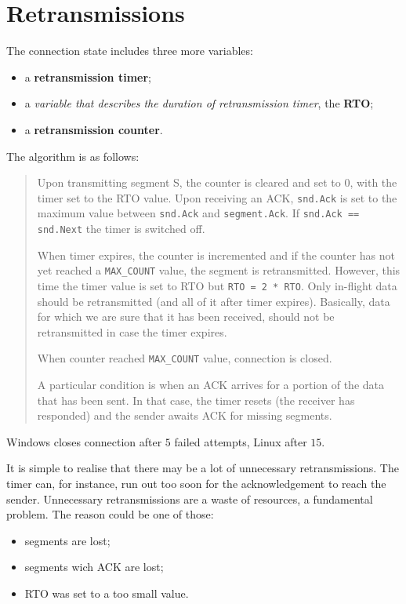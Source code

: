 \documentclass[a4paper, 11pt]{report}
\begin{document}
\section{Retransmissions}

The connection state includes three more variables:

\begin{itemize}
	\item a \textbf{retransmission timer};
	\item a \emph{variable that describes the duration of retransmission
		timer}, the \textbf{RTO};
	\item a \textbf{retransmission counter}.
\end{itemize}

The algorithm is as follows:

\begin{quote}
Upon transmitting segment S, the counter is cleared and set to $0$, with the
timer set to the RTO value. Upon receiving an ACK, \texttt{snd.Ack} is set to
the maximum value between \texttt{snd.Ack} and \texttt{segment.Ack}. If
\texttt{snd.Ack == snd.Next} the timer is switched off.

When timer expires, the counter is incremented and if the counter has not yet
reached a \texttt{MAX\_COUNT} value, the segment is retransmitted. However, this
time the timer value is set to RTO but \texttt{RTO = 2 * RTO}. Only in-flight data
should be retransmitted (and all of it after timer expires). Basically, data
for which we are sure that it has been received, should not be retransmitted in
case the timer expires.

When counter reached \texttt{MAX\_COUNT} value, connection is closed.

A particular condition is when an ACK arrives for a portion of the data that
has been sent. In that case, the timer resets (the receiver has responded) and
the sender awaits ACK for missing segments.
\end{quote}

Windows closes connection after $5$ failed attempts, Linux after $15$.

It is simple to realise that there may be a lot of unnecessary retransmissions.
The timer can, for instance, run out too soon for the acknowledgement to reach
the sender. Unnecessary retransmissions are a waste of resources, a fundamental
problem. The reason could be one of those:

\begin{itemize}
	\item segments are lost;
	\item segments wich ACK are lost;
	\item RTO was set to a too small value.
\end{itemize}
\end{document}
